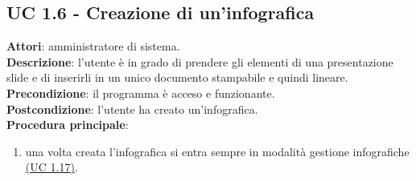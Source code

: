 \subsection{UC 1.6 - Creazione di un'infografica}{
	\label{uc1.6}
	\textbf{Attori}: amministratore di sistema. \\
	\textbf{Descrizione}: l'utente è in grado di prendere gli elementi di una presentazione slide e di inserirli in un unico documento stampabile e quindi lineare. \\
	\textbf{Precondizione}: il programma è acceso e funzionante.	\\
	\textbf{Postcondizione}: l'utente ha creato un'infografica.	\\
	\textbf{Procedura principale}:
	\begin{enumerate}
		\item una volta creata l'infografica si entra sempre in modalità gestione infografiche \hyperref[uc1.17]{(UC 1.17)}.
	\end{enumerate}
	}
